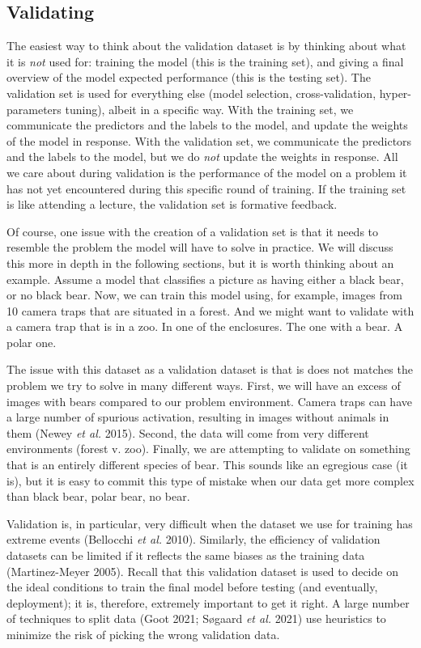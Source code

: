 \documentclass[
  letterpaper,
]{scrbook}
\begin{document}
\subsection{Validating}\label{validating}

The easiest way to think about the validation dataset is by thinking
about what it is \emph{not} used for: training the model (this is the
training set), and giving a final overview of the model expected
performance (this is the testing set). The validation set is used for
everything else (model selection, cross-validation, hyper-parameters
tuning), albeit in a specific way. With the training set, we communicate
the predictors and the labels to the model, and update the weights of
the model in response. With the validation set, we communicate the
predictors and the labels to the model, but we do \emph{not} update the
weights in response. All we care about during validation is the
performance of the model on a problem it has not yet encountered during
this specific round of training. If the training set is like attending a
lecture, the validation set is formative feedback.

Of course, one issue with the creation of a validation set is that it
needs to resemble the problem the model will have to solve in practice.
We will discuss this more in depth in the following sections, but it is
worth thinking about an example. Assume a model that classifies a
picture as having either a black bear, or no black bear. Now, we can
train this model using, for example, images from 10 camera traps that
are situated in a forest. And we might want to validate with a camera
trap that is in a zoo. In one of the enclosures. The one with a bear. A
polar one.

The issue with this dataset as a validation dataset is that is does not
matches the problem we try to solve in many different ways. First, we
will have an excess of images with bears compared to our problem
environment. Camera traps can have a large number of spurious
activation, resulting in images without animals in them (Newey \emph{et
al.} 2015). Second, the data will come from very different environments
(forest v. zoo). Finally, we are attempting to validate on something
that is an entirely different species of bear. This sounds like an
egregious case (it is), but it is easy to commit this type of mistake
when our data get more complex than black bear, polar bear, no bear.

Validation is, in particular, very difficult when the dataset we use for
training has extreme events (Bellocchi \emph{et al.} 2010). Similarly,
the efficiency of validation datasets can be limited if it reflects the
same biases as the training data (Martinez-Meyer 2005). Recall that this
validation dataset is used to decide on the ideal conditions to train
the final model before testing (and eventually, deployment); it is,
therefore, extremely important to get it right. A large number of
techniques to split data (Goot 2021; Søgaard \emph{et al.} 2021) use
heuristics to minimize the risk of picking the wrong validation data.
\end{document}

